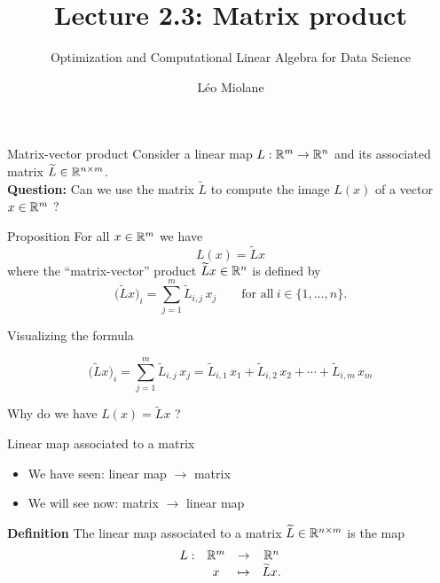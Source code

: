\documentclass{beamer}
\title{Lecture 2.3: Matrix product}
\subtitle{Optimization and Computational Linear Algebra for Data Science}
\author{Léo Miolane}
\date{}
\begin{document}
\setcounter{showProgressBar}{0}
\setcounter{showSlideNumbers}{0}

\frame{\titlepage}


\setcounter{framenumber}{0}
\setcounter{showSlideNumbers}{1}

\begin{frame}[t]{Matrix-vector product}
	Consider a linear map $L:\mathbb{R}^m \to \mathbb{R}^n$ and its associated matrix $\widetilde{L} \in \mathbb{R}^{n \times m}$.
	\\
	\vspace{0.3cm}
	\textbf{Question:} Can we use the matrix $\widetilde{L}$ to compute the image $L(x)$ of a vector $x\in\mathbb{R}^m$ ?
	\vspace{0.3cm}

	\begin{block}{Proposition}
		For all $x\in\mathbb{R}^m$ we have
		$$
		L(x) = \widetilde{L} x
		$$
		where the ``matrix-vector'' product $\widetilde{L}x \in \mathbb{R}^n$ is defined by
		$$
		\big(\widetilde{L}x\big)_i = \sum_{j=1}^m \widetilde{L}_{i,j} \, x_j \qquad \text{for all} \ i \in \{1, \dots, n\}.
		$$
		\vspace{-0.5cm}
	\end{block}
\end{frame}
\begin{frame}[t]{Visualizing the formula}
	\vspace{-0.9cm}
	\begin{exampleblock}{}
		\vspace{-0.4cm}
		$$
		\big(\widetilde{L}x\big)_i = \sum_{j=1}^m \widetilde{L}_{i,j} \, x_j
		= \widetilde{L}_{i,1} \, x_1 + \widetilde{L}_{i,2} \, x_2 + \cdots + \widetilde{L}_{i,m} \, x_m
		$$
		\vspace{-0.4cm}
	\end{exampleblock}
\end{frame}
\begin{frame}[t]{Why do we have $L(x) = \widetilde{L} x$ ?}
\end{frame}

\begin{frame}[t]{Linear map associated to a matrix}
	\begin{itemize}
		\item We have seen: \quad linear map $\to$ matrix
		\item We will see now: \quad matrix $\to$ linear map
	\end{itemize}

	\vspace{0.1cm}
	\begin{block}{\bf Definition}
		The linear map associated to a matrix $\widetilde{L} \in \mathbb{R}^{n \times m}$ is the map
		$$
		\begin{array}{cccc}
			L:& \mathbb{R}^m & \to & \mathbb{R}^n \\
			  & x & \mapsto & \widetilde{L}x.
		\end{array}
		$$
		\vspace{-0.5cm}
	\end{block}
\end{frame}
\end{document}
